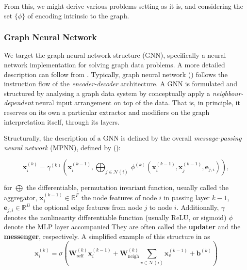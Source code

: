 \documentclass[10pt,oneside,oldfontcommands,dvipsnames,article]{memoir}
\begin{document}
From this, we might derive various problems setting as it is, and considering the set $\{\phi\}$ of encoding intrinsic to the graph. 

\subsubsection{Graph Neural Network}

We target the graph neural network structure (GNN), specifically a neural network implementation for solving graph data problems. A more detailed description can follow from \cite{GRP_Hamilton,Scar04}. Typically, graph neural network (\cite{Scar04,Veli_kovi__2023,tanis2024introductiongraphneuralnetworks,lopushanskyy2024graphneuralnetworksgraph}) follows the instruction flow of the \textit{encoder-decoder} architecture. A GNN is formulated and structured by analysing a graph data system by conceptually apply a \textit{neighbour-dependent} neural input arrangement on top of the data. That is, in principle, it reserves on its own a particular extractor and modifiers on the graph interpretation itself, through its layers. 

Structurally, the description of a GNN is defined by the overall \textit{message-passing neural network} (MPNN), defined by (\cite{pyg_docs,Fey/Lenssen/2019}): 

\begin{equation}
    \mathbf{x}_i^{(k)} = \gamma^{(k)} \left( \mathbf{x}_i^{(k-1)}, \bigoplus_{j \in \mathcal{N}(i)} \, \phi^{(k)}\left(\mathbf{x}_i^{(k-1)}, \mathbf{x}_j^{(k-1)},\mathbf{e}_{j,i}\right) \right),
\end{equation}

for $\bigoplus$ the differentiable, permutation invariant function, usually called the aggregator, $\mathbf{x}^{(k-1)}_i \in \mathbb{R}^F$ the node features of node $i$ in passing layer $k-1$, $\mathbf{e}_{j,i} \in \mathbb{R}^D$ the optional edge features from node $j$ to node $i$. Additionally, $\gamma$ denotes the nonlinearity differentiable function (usually ReLU, or sigmoid) $\phi$ denote the MLP layer accompanied They are often called the \textbf{updater} and the \textbf{messenger}, respectively. A simplified example of this structure in \cite{Scar04,GRP_Hamilton} as 
\begin{equation}
    \mathbf{x}_i^{(k)} = \sigma \left( \mathbf{W}_{\mathrm{self}}^{(k)} \mathbf{x}_i^{(k-1)} +  \mathbf{W}_{\mathrm{neigh}}^{(k)} \sum_{v\in \mathcal{N}(i)} \mathbf{x}_v^{(k-1)} + \mathbf{b}^{(k)} \right)
\end{equation}
\end{document}
